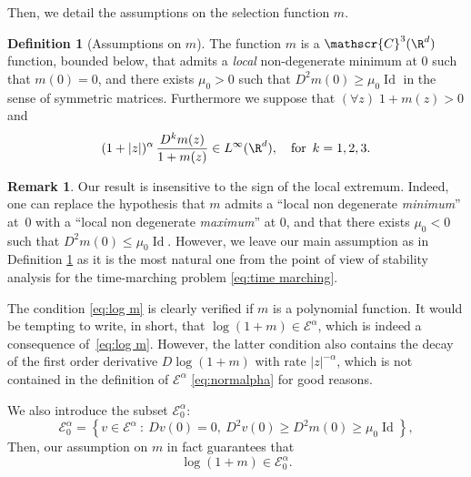 \documentclass[JEP,XML,SOM,Unicode]{cedram}
\let\mathcal\mathscr
\newcommand{\cC}{\mathcal{C}}
\theoremstyle{plain}
\theoremstyle{definition}
\newtheorem{definition}[thm]{Definition}
\newtheorem{remark}[thm]{Remark}
\newcommand{\abs}[1]{\left\lvert#1\right\rvert}
\newcommand{\Ea}{\mathcal{E}^\alpha}
\newcommand{\Eaz}{\mathcal{E}^\alpha_0}
\DeclareMathOperator{\Id}{Id}
\begin{document}
Then, we detail the assumptions on the selection function $m$.
\begin{definition}[Assumptions on $m$]\label{def m}
The function $m$ is a $\cC^3(\R^d)$ function, bounded below, that admits a \emph{local} non-degenerate minimum at $0$ such that $m(0)=0$, and there exists $\mu_0>0$ such that $D^2 m(0) \geq \mu_0 \Id$ in the sense of symmetric matrices.
Furthermore we suppose that $(\forall z)\; 1+m(z) > 0$ and
\begin{equation}\label{eq:log m}
(1+\abs{z})^\alpha\, \dfrac{D^k m(z)}{1+m(z)} \in L^\infty(\R^d), \quad \text{for\, $k = 1,2,3$}.
\end{equation}
\end{definition}
\begin{remark}\label{rem:SM} Our result is insensitive to the sign of the local extremum. Indeed, one can replace the hypothesis that $m$ admits a ``local non degenerate \emph{minimum}'' at~$0$ with a ``local non degenerate \emph{maximum}'' at 0, and that there exists $\mu_0 <0$ such that $ D^2 m(0) \leq \mu_0 \Id$. However, we leave our main assumption as in Definition \ref{def m} as it is the most natural one from the point of view of stability analysis for the time-marching problem \eqref{eq:time marching}.
\end{remark}
The condition \eqref{eq:log m} is clearly verified if $m$ is a polynomial function. It would be tempting to write, in short, that $\log(1+m)\in \Ea$, which is indeed a consequence of~\eqref{eq:log m}. However, the latter condition also contains the decay of the first order deri\-va\-tive $D\log(1+m)$ with rate $|z|^{-\alpha}$, which is not contained in the definition of $\Ea$ \eqref{eq:normalpha} for good reasons.

We also introduce the subset $\Eaz$:
\begin{equation}\label{eq:E0}
\Eaz = \left\{ v \in \Ea\::\: D v(0)=0, \ D^2 v(0) \geq D^2 m(0) \geq \mu_0 \Id \right\},
\end{equation}
Then, our assumption on $m$ in fact guarantees	 that
\begin{equation}\label{cond logm inEaz}
\log(1+m) \in \Eaz.
\end{equation}
	
\end{document}

